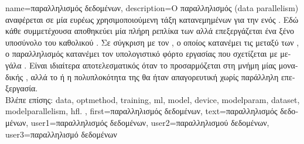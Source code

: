 {name={\foreignlanguage{greek}{παραλληλισμός δεδομένων}},
	description={\foreignlanguage{greek}{Ο παραλληλισμός}  (data parallelism) 
		\foreignlanguage{greek}{αναφέρεται σε μία ευρέως χρησιμοποιούμενη τάξη κατανεμημένων}  \foreignlanguage{greek}{για 
		την}  \foreignlanguage{greek}{ενός}  . \foreignlanguage{greek}{Εδώ κάθε συμμετέχουσα}  
		 \foreignlanguage{greek}{αποθηκεύει μία πλήρη ρεπλίκα των}  \foreignlanguage{greek}{αλλά 
		επεξεργάζεται ένα ξένο υποσύνολο του καθολικού}  \cite{DistrOptStatistLearningADMM}. 
             	\foreignlanguage{greek}{Σε σύγκριση με τον} , \foreignlanguage{greek}{ο οποίος κατανέμει τις}
		 \foreignlanguage{greek}{μεταξύ των} , \foreignlanguage{greek}{ο παραλληλισμός} 
		 \foreignlanguage{greek}{κατανέμει τον υπολογιστικό φόρτο εργασίας που σχετίζεται με μεγάλα} . 
             	\foreignlanguage{greek}{Είναι ιδι\-αί\-τερα αποτελεσματικός όταν το}  \foreignlanguage{greek}{προσαρμόζεται 
		στη μνήμη μίας μοναδικής} , \foreignlanguage{greek}{αλλά το}  \foreignlanguage{greek}{ή η 
		πολυπλοκότητα της}  \foreignlanguage{greek}{θα ήταν απαγορευτική χωρίς παράλληλη επεξεργασία}.  
             	\\
             	\foreignlanguage{greek}{Βλέπε επίσης:} \gls{data}, \gls{optmethod}, \gls{training}, \gls{ml}, \gls{model}, \gls{device}, \gls{modelparam}, 
		\gls{dataset}, \gls{modelparallelism}, \gls{hfl}. },
 	first={\foreignlanguage{greek}{παραλληλισμός δεδομένων}},
 	text={\foreignlanguage{greek}{παραλληλισμός δεδομένων}},
	user1={\foreignlanguage{greek}{παραλληλισμός δεδομένων}}, %
	user2={\foreignlanguage{greek}{παραλληλισμού δεδομένων}}, %
	user3={\foreignlanguage{greek}{παραλληλισμό δεδομένων}} %
}

